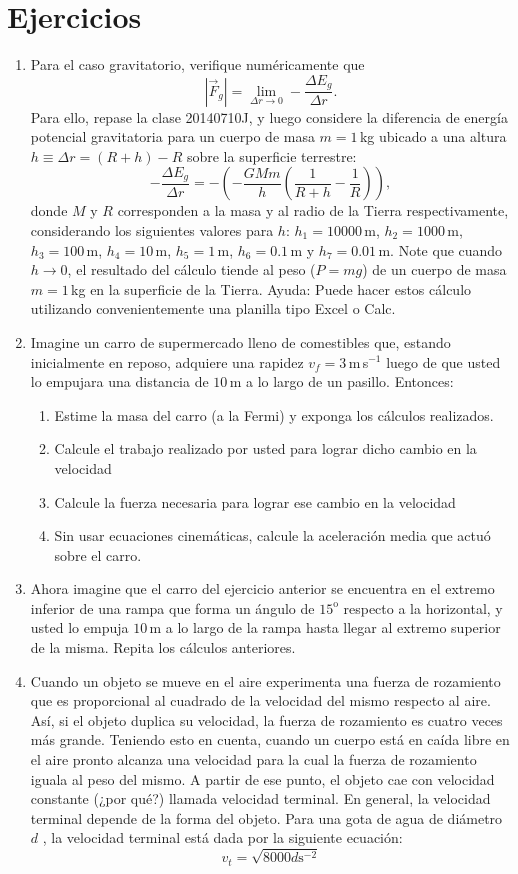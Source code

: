 \documentclass[a4paper,12pt]{article}
\begin{document}
\section*{Ejercicios}

\begin{enumerate}
  \item Para el caso gravitatorio, verifique numéricamente que 
    \[
      \left | \vec F_g \right | = \lim_{\Delta r \to 0} - \frac{\Delta E_g}{\Delta r}.
    \]
    Para ello, repase la clase 20140710J, y luego considere la diferencia de energía potencial gravitatoria para un cuerpo de masa $m=1$\,kg ubicado a una altura $h \equiv \Delta r = (R+h)-R$ sobre la superficie terrestre:
    \[
      - \frac{\Delta E_g}{\Delta r} = -\left (- \frac{G M m}{h} \left ( \frac{1}{R+h} - \frac{1}{R} \right ) \right ),
    \]
    donde $M$ y $R$ corresponden a la masa y al radio de la Tierra respectivamente, considerando los siguientes valores para $h$: $h_1=10000$\,m, $h_2=1000$\,m, $h_3=100$\,m, $h_4=10$\,m, $h_5=1$\,m, $h_6=0.1$\,m y $h_7=0.01$\,m. Note que cuando $h\to0$, el resultado del cálculo tiende al peso ($P=mg$) de un cuerpo de masa $m=1$\,kg en la superficie de la Tierra. Ayuda: Puede hacer estos cálculo utilizando convenientemente una planilla tipo Excel o Calc.
  \item Imagine un carro de supermercado lleno de comestibles que, estando inicialmente en reposo, adquiere una rapidez $v_f=3$\,m\,s$^{-1}$ luego de que usted lo empujara una distancia de $10$\,m a lo largo de un pasillo. Entonces: 
    \begin{enumerate}
      \item Estime la masa del carro (a la Fermi) y exponga los cálculos realizados.
      \item Calcule el trabajo realizado por usted para lograr dicho cambio en la velocidad
      \item Calcule la fuerza necesaria para lograr ese cambio en la velocidad
      \item Sin usar ecuaciones cinemáticas, calcule la aceleración media que actuó sobre el carro.
    \end{enumerate}
  \item Ahora imagine que el carro del ejercicio anterior se encuentra en el extremo inferior de una rampa que forma un ángulo de $15^\mathrm{o}$ respecto a la horizontal, y usted lo empuja $10$\,m a lo largo de la rampa hasta llegar al extremo superior de la misma. Repita los cálculos anteriores.
  \item Cuando un objeto se mueve en el aire experimenta una fuerza de rozamiento que es proporcional al cuadrado de la velocidad del mismo respecto al aire. Así, si el objeto duplica su velocidad, la fuerza de rozamiento es cuatro veces más grande. Teniendo esto en cuenta, cuando un cuerpo está en caída libre en el aire pronto alcanza una velocidad para la cual la fuerza de rozamiento iguala al peso del mismo. A partir de ese punto, el objeto cae con velocidad constante (¿por qué?) llamada velocidad terminal. En general, la velocidad terminal depende de la forma del objeto. Para una gota de agua de diámetro $d$ , la velocidad terminal está dada por la siguiente ecuación:
    \[
      v_t = \sqrt{8000 d \mathrm{s}^{-2}}
    \]


\end{enumerate}
\end{document}
